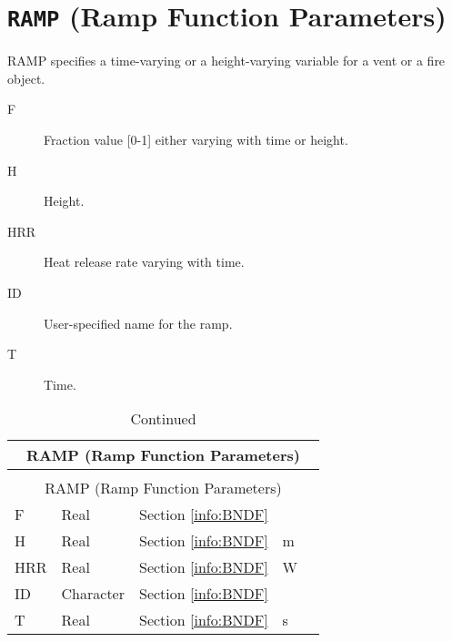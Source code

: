 \vspace{\baselineskip}


\section{\texorpdfstring{{\tt RAMP}}{RAMP} (Ramp Function Parameters)}

RAMP specifies a time-varying or a height-varying variable for a vent or a fire object.

\begin{adjustwidth}{1cm}{0cm}
\begin{description}
  \item[F] Fraction value [0-1] either varying with time or height.
  \item[H] Height.
  \item[HRR] Heat release rate varying with time.
  \item[ID] User-specified name for the ramp.
  \item[T] Time.
\end{description}
\end{adjustwidth}

\begin{longtable}{@{\extracolsep{\fill}}|l|l|l|l|l|}
\caption[Boundary file parameters ({\ct RAMP} namelist group)]{For more information see Section~\ref{info:BNDF}.}
\label{tbl:RAMP} \\
\hline
\multicolumn{5}{|c|}{{\ct RAMP} (Ramp Function Parameters)} \\
\hline \hline
\endfirsthead
\caption[]{Continued} \\
\hline
\multicolumn{5}{|c|}{{\ct RAMP} (Ramp Function Parameters)} \\
\hline \hline
\endhead
{\ct F}               & Real        & Section \ref{info:BNDF}                 &           &                 \\ \hline
{\ct H}               & Real        & Section \ref{info:BNDF}                 &  m         &                 \\ \hline
{\ct HRR}             & Real        & Section \ref{info:BNDF}                 & W         &                 \\ \hline
{\ct ID}       	      & Character   & Section \ref{info:BNDF}                 &           &                 \\ \hline
{\ct T}               & Real        & Section \ref{info:BNDF}                 &  s        &                 \\ \hline
\end{longtable}

